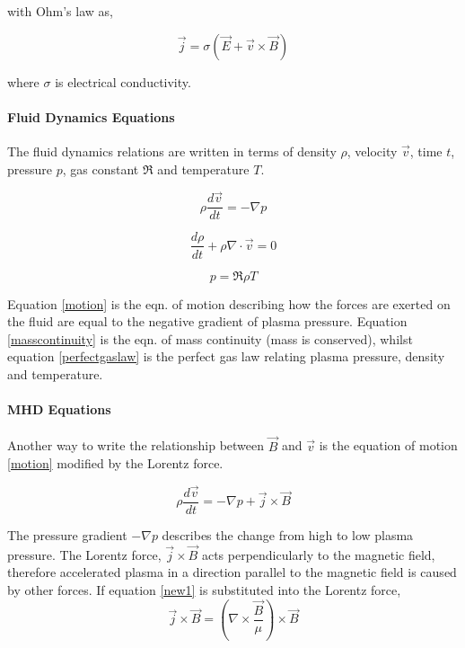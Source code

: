 with Ohm's law as,

\begin{equation}\label{ohmslaw}
\vec{j}=\sigma(\vec{E}+\vec{v}\times\vec{B})
\end{equation}

where $\sigma$ is electrical conductivity. 

\paragraph{Fluid Dynamics Equations}
The fluid dynamics relations are written in terms of density $\rho$, velocity $\vec{v}$, time $t$, pressure $p$, gas constant $\Re$ and temperature $T$. 

\begin{equation}\label{motion}
\rho\frac{d\vec{v}}{dt}=-\nabla p
\end{equation}
 
\begin{equation}\label{masscontinuity}
\frac{d\rho}{dt}+\rho\nabla\cdot\vec{v}=0
\end{equation}

\begin{equation}\label{perfectgaslaw}
p=\Re\rho T
\end{equation}

Equation \ref{motion} is the eqn. of motion describing how the forces are exerted on the fluid are equal to the negative gradient of plasma pressure. Equation \ref{masscontinuity} is the eqn. of mass continuity (mass is conserved), whilst equation \ref{perfectgaslaw} is the perfect gas law relating plasma pressure, density and temperature. 

\paragraph{MHD Equations}
Another way to write the relationship between $\vec{B}$ and $\vec{v}$ is the equation of motion \ref{motion} modified by the Lorentz force.

\begin{equation}\label{motion1}
\rho\frac{d\vec{v}}{dt}=-\nabla p+\vec{j}\times\vec{B}
\end{equation}

The pressure gradient $-\nabla p$ describes the change from high to low plasma pressure. The Lorentz force, $\vec{j}\times\vec{B}$ acts perpendicularly to the magnetic field, therefore accelerated plasma in a direction parallel to the magnetic field is caused by other forces. If equation \ref{new1} is substituted into the Lorentz force,
\begin{equation}\label{lorentzsub1}
\vec{j}\times\vec{B} = (\nabla\times\frac{\vec{B}}{\mu})\times\vec{B}
\end{equation}


